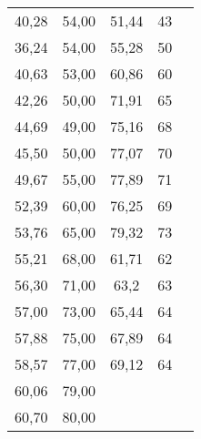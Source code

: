 \documentclass[a4paper, 12pt]{article}
\begin{document}
\begin{longtable}{|c|c|c|c|c|c|}
40,28          & 54,00           & 51,44              & 43                 & \multicolumn{2}{c|}{\multirow{35}{*}{}} \\ \cline{1-4}
36,24          & 54,00           & 55,28              & 50                 & \multicolumn{2}{c|}{}                   \\ \cline{1-4}
40,63          & 53,00           & 60,86              & 60                 & \multicolumn{2}{c|}{}                   \\ \cline{1-4}
42,26          & 50,00           & 71,91              & 65                 & \multicolumn{2}{c|}{}                   \\ \cline{1-4}
44,69          & 49,00           & 75,16              & 68                 & \multicolumn{2}{c|}{}                   \\ \cline{1-4}
45,50          & 50,00           & 77,07              & 70                 & \multicolumn{2}{c|}{}                   \\ \cline{1-4}
49,67          & 55,00           & 77,89              & 71                 & \multicolumn{2}{c|}{}                   \\ \cline{1-4}
52,39          & 60,00           & 76,25              & 69                 & \multicolumn{2}{c|}{}                   \\ \cline{1-4}
53,76          & 65,00           & 79,32              & 73                 & \multicolumn{2}{c|}{}                   \\ \cline{1-4}
55,21          & 68,00           & 61,71              & 62                 & \multicolumn{2}{c|}{}                   \\ \cline{1-4}
56,30          & 71,00           & 63,2               & 63                 & \multicolumn{2}{c|}{}                   \\ \cline{1-4}
57,00          & 73,00           & 65,44              & 64                 & \multicolumn{2}{c|}{}                   \\ \cline{1-4}
57,88          & 75,00           & 67,89              & 64                 & \multicolumn{2}{c|}{}                   \\ \cline{1-4}
58,57          & 77,00           & 69,12              & 64                 & \multicolumn{2}{c|}{}                   \\ \cline{1-4}
60,06          & 79,00           & \multicolumn{2}{c|}{\multirow{21}{*}{}} & \multicolumn{2}{c|}{}                   \\ \cline{1-2}
60,70          & 80,00           & \multicolumn{2}{c|}{}                   & \multicolumn{2}{c|}{}                   \\ \cline{1-2}

\end{longtable}
\end{document}
